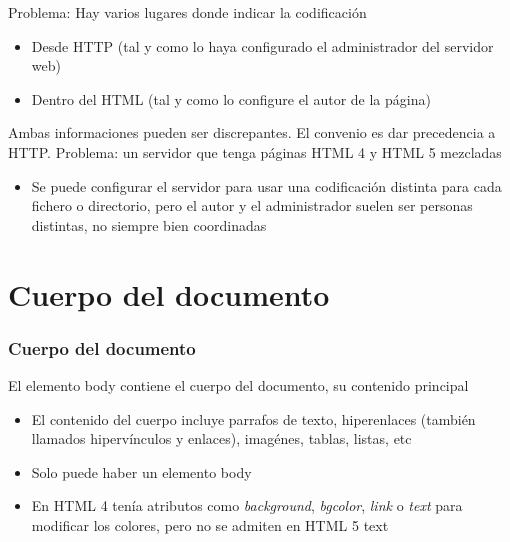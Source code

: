 \documentclass[ucs]{beamer}
\begin{document}
\begin{frame}[fragile]

Problema:
Hay varios lugares donde indicar la codificación


\begin{itemize}
\item
Desde HTTP
(tal y como lo haya configurado el administrador del servidor web)

\item
Dentro del HTML
(tal y como lo configure el autor de la página)
\end{itemize}

Ambas informaciones pueden ser discrepantes.
El convenio es dar precedencia a HTTP.
Problema: un servidor que tenga páginas HTML 4 y HTML 5 mezcladas


    \begin{itemize}
    \item
Se puede configurar el servidor para usar una codificación distinta para
cada fichero o directorio, pero el autor y el administrador suelen
ser personas distintas, no siempre bien coordinadas
    \end{itemize}



\end{frame}



\section{Cuerpo del documento}


\begin{frame}[fragile]
\frametitle{Cuerpo del documento}
El elemento body contiene el cuerpo del documento, su contenido principal


\begin{itemize}
\item
El contenido del cuerpo incluye
parrafos de texto, hiperenlaces (también llamados hipervínculos y enlaces), imagénes, tablas, listas, etc

\item
Solo puede haber un elemento body

\item
En HTML 4 tenía atributos como 
\emph{background},
\emph{bgcolor},
\emph{link}
o
\emph{text} para modificar los colores, pero no se admiten en HTML 5
text
\end{itemize}

\end{frame}
\end{document}
